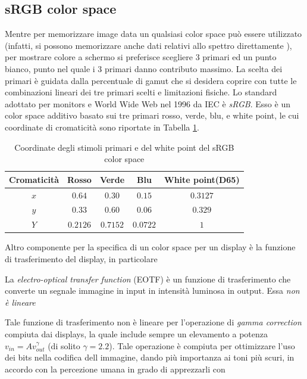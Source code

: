 \subsection{sRGB color space}
Mentre per memorizzare image data un qualsiasi color space pu\`o essere utilizzato (infatti, si possono memorizzare anche dati relativi allo spettro 
direttamente \cite{fichet}), per mostrare colore a schermo si preferisce scegliere 3 primari ed un punto bianco, punto nel quale i 3 primari danno
contributo massimo. La scelta dei primari \`e guidata dalla percentuale di gamut che si desidera coprire con tutte le combinazioni lineari dei tre
primari scelti e limitazioni fisiche. Lo standard adottato per monitors e World Wide Web nel 1996 da IEC \`e \textit{sRGB}. Esso \`e un color space 
additivo basato sui tre primari rosso, verde, blu, e white point, le cui coordinate di cromaticit\`a sono riportate in Tabella 
\ref{chapter2:colorimetry:sRGB}.\par
\begin{table}
	\begin{tabularx}{\linewidth}{ccccc}
		\toprule
		Cromaticit\`a & Rosso & Verde & Blu & White point(D65)\\
		\midrule
		$x$ & $0.64$ & $0.30$ & $0.15$ & $0.3127$\\
		$y$ & $0.33$ & $0.60$ & $0.06$ & $0.329$\\
		$Y$ & $0.2126$ & $0.7152$ & $0.0722$ & $1$\\
		\bottomrule
	\end{tabularx}
	\caption{Coordinate degli stimoli primari e del white point del sRGB color space}
	\label{chapter2:colorimetry:sRGB}
\end{table}
Altro componente per la specifica di un color space per un display \`e la funzione di trasferimento del display, in particolare 
\begin{definitionS}
	La \textit{electro-optical transfer function} (EOTF) \`e un funzione di trasferimento che converte un segnale immagine in input in intensit\`a 
	luminosa in output. Essa \textit{non \`e lineare}
\end{definitionS}
Tale funzione di trasferimento non \`e lineare per l'operazione di \textit{gamma correction} compiuta dai displays, la quale include sempre un 
elevamento a potenza $v_{in} = Av_{out}^\gamma$ (di solito $\gamma = 2.2$). Tale operazione \`e compiuta per ottimizzare l'uso dei bits 
nella codifica dell immagine, dando pi\`u importanza ai toni pi\`u scuri, in accordo con la percezione umana in grado di apprezzarli con 
